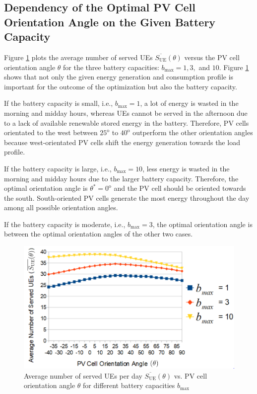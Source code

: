 \subsection{Dependency of the Optimal PV Cell Orientation Angle on the Given Battery Capacity\label{new}}


 


Figure \ref{result2} plots the average number of served UEs $\overline{S_{\mathrm{UE}}}(\theta)$ versus the PV cell orientation angle $\theta$ for the three battery capacities: $b_{\mathrm{max}}=1, 3,$ and $10$. Figure \ref{result2} shows that not only the given energy generation and consumption profile is important for the outcome of the optimization but also the battery capacity. 

If the battery capacity is small, i.e., $b_{\max}=1$, a lot of energy is wasted in the morning and midday hours, whereas UEs cannot be served in the afternoon due to a lack of available renewable stored energy in the battery. Therefore, PV cells orientated to the west between $25^{\mathrm{o}}$ to $40^{\mathrm{o}}$ outperform the other orientation angles because west-orientated PV cells shift the energy generation towards the load profile. 

If the battery capacity is large, i.e., $b_{\max}=10$, less energy is wasted in the morning and midday hours due to the larger battery capacity. Therefore, the optimal orientation angle is $\theta^*=0^{\mathrm{o}}$ and the PV cell should be oriented towards the south. South-oriented PV cells generate the most energy throughout the day among all possible orientation angles.

If the battery capacity is moderate, i.e., $b_{\max}=3$, the optimal orientation angle is between the optimal orientation angles of the other two cases.






\begin{figure}[H]
	\centering
		\includegraphics[width=1\textwidth]{pictures/different_batteries}
\caption{Average number of served UEs per day $\overline{S_{\mathrm{UE}}}(\theta)$ vs. PV cell orientation angle $\theta$ for different battery capacities $b_{\mathrm{max}}$ \label{result2}}
\end{figure}

